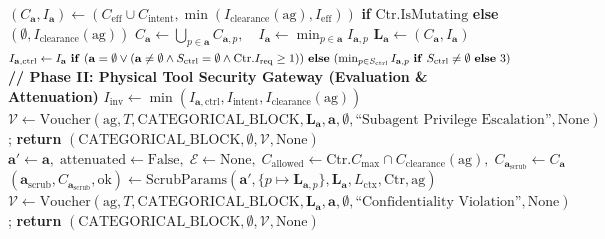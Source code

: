 \documentclass[conference,10pt]{IEEEtran}
\begin{document}
\begin{algorithm*}[!t]
\begin{algorithmic}[1]
    \STATE $(C_{\mathbf{a}}, I_{\mathbf{a}}) \leftarrow (C_{\text{eff}} \cup C_{\text{intent}}, \min(I_{\text{clearance}}(\text{ag}), I_{\text{eff}}))$ \textbf{if} $\text{Ctr.IsMutating}$ \textbf{else} $(\emptyset, I_{\text{clearance}}(\text{ag}))$
\ELSE
    \STATE $C_{\mathbf{a}} \leftarrow \bigcup_{p \in \mathbf{a}} C_{\mathbf{a}, p}, \quad I_{\mathbf{a}} \leftarrow \min_{p \in \mathbf{a}} I_{\mathbf{a}, p}$
\ENDIF
\STATE $\mathbf{L}_{\mathbf{a}} \leftarrow (C_{\mathbf{a}}, I_{\mathbf{a}})$
\STATE $I_{\mathbf{a}, \text{ctrl}} \leftarrow I_{\mathbf{a}} \text{ \textbf{if} } (\mathbf{a} = \emptyset \lor (\mathbf{a} \ne \emptyset \land S_{\text{ctrl}} = \emptyset \land \text{Ctr}.I_{\text{req}} \ge 1)) \text{ \textbf{else} } (\min_{p \in S_{\text{ctrl}}} I_{\mathbf{a}, p} \text{ \textbf{if} } S_{\text{ctrl}} \ne \emptyset \text{ \textbf{else} } 3)$
\STATE \textbf{// Phase II: Physical Tool Security Gateway (Evaluation \& Attenuation)}
\STATE $I_{\text{inv}} \leftarrow \min(I_{\mathbf{a}, \text{ctrl}}, I_{\text{intent}}, I_{\text{clearance}}(\text{ag}))$
    \STATE $\mathcal{V} \leftarrow \text{Voucher}(\text{ag}, T, \text{CATEGORICAL\_BLOCK}, \mathbf{L}_{\mathbf{a}}, \mathbf{a}, \emptyset, \text{``Subagent Privilege Escalation''}, \text{None})$; \quad \textbf{return} $(\text{CATEGORICAL\_BLOCK}, \emptyset, \mathcal{V}, \text{None})$
\ENDIF
\STATE $\mathbf{a}' \leftarrow \mathbf{a}, \; \text{attenuated} \leftarrow \text{False}, \; \mathcal{E} \leftarrow \text{None}, \; C_{\text{allowed}} \leftarrow \text{Ctr}.C_{\text{max}} \cap C_{\text{clearance}}(\text{ag}), \; C_{\mathbf{a}_{\text{scrub}}} \leftarrow C_{\mathbf{a}}$
    \STATE $(\mathbf{a}_{\text{scrub}}, C_{\mathbf{a}_{\text{scrub}}}, \text{ok}) \leftarrow \text{ScrubParams}(\mathbf{a}', \{p \mapsto \mathbf{L}_{\mathbf{a}, p}\}, \mathbf{L}_{\mathbf{a}}, L_{\text{ctx}}, \text{Ctr}, \text{ag})$
        \STATE $\mathcal{V} \leftarrow \text{Voucher}(\text{ag}, T, \text{CATEGORICAL\_BLOCK}, \mathbf{L}_{\mathbf{a}}, \mathbf{a}, \emptyset, \text{``Confidentiality Violation''}, \text{None})$; \quad \textbf{return} $(\text{CATEGORICAL\_BLOCK}, \emptyset, \mathcal{V}, \text{None})$
    \ENDIF

\end{algorithmic}
\end{algorithm*}
\end{document}
